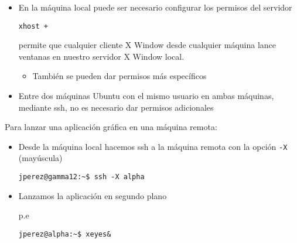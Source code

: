 \documentclass[ucs]{beamer}
\begin{document}
\begin{frame}[fragile]
\begin{itemize}


\item
En la máquina local puede ser necesario configurar los permisos del servidor


\verb|xhost +| 

permite que cualquier cliente X Window
desde cualquier máquina lance ventanas en nuestro servidor
X Window local. 


\begin{itemize}
\item
También se pueden dar permisos más específicos
\end{itemize}

\item
Entre dos máquinas Ubuntu con el mismo usuario en ambas
máquinas, mediante ssh, no es necesario dar permisos adicionales

\end{itemize}


Para lanzar una aplicación gráfica en una máquina remota:

\begin{itemize}
\item
Desde la máquina local hacemos ssh a la máquina remota con la opción
\verb|-X| (mayúscula)


\verb|jperez@gamma12:~$ ssh -X alpha| 


\item
Lanzamos la aplicación en segundo plano

p.e

\verb|jperez@alpha:~$ xeyes&|

\end{itemize}
\end{frame}
\end{document}
